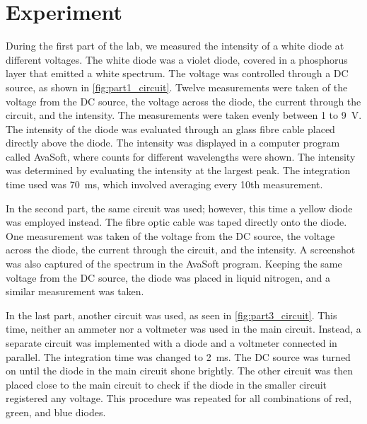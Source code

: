 \section{Experiment}
During the first part of the lab, we measured the intensity of a white diode at different voltages. The white diode was a violet diode, covered in a phosphorus layer that emitted a white spectrum. The voltage was controlled through a DC source, as shown in \autoref{fig:part1_circuit}. Twelve measurements were taken of the voltage from the DC source, the voltage across the diode, the current through the circuit, and the intensity. The measurements were taken evenly between 1 to \SI{9}{\volt}. The intensity of the diode was evaluated through an glass fibre cable placed directly above the diode. The intensity was displayed in a computer program called AvaSoft, where counts for different wavelengths were shown. The intensity was determined by evaluating the intensity at the largest peak. The integration time used was \SI{70}{\milli\s}, which involved averaging every 10th measurement.

In the second part, the same circuit was used; however, this time a yellow diode was employed instead. The fibre optic cable was taped directly onto the diode. One measurement was taken of the voltage from the DC source, the voltage across the diode, the current through the circuit, and the intensity. A screenshot was also captured of the spectrum in the AvaSoft program. Keeping the same voltage from the DC source, the diode was placed in liquid nitrogen, and a similar measurement was taken.

In the last part, another circuit was used, as seen in \autoref{fig:part3_circuit}. This time, neither an ammeter nor a voltmeter was used in the main circuit. Instead, a separate circuit was implemented with a diode and a voltmeter connected in parallel. The integration time was changed to \SI{2}{\milli\s}. The DC source was turned on until the diode in the main circuit shone brightly. The other circuit was then placed close to the main circuit to check if the diode in the smaller circuit registered any voltage. This procedure was repeated for all combinations of red, green, and blue diodes.



